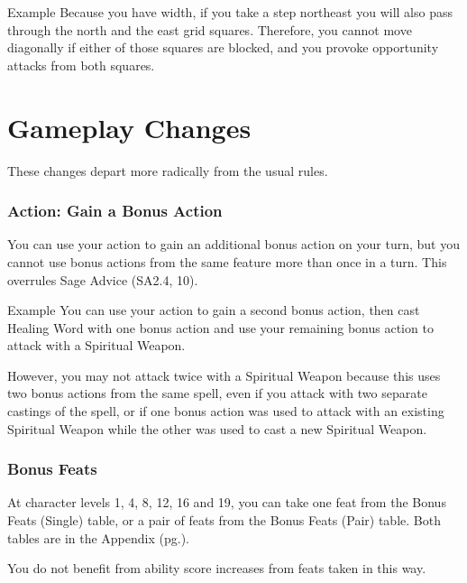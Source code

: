 \documentclass[letterpaper,twocolumn,openany,nodeprecatedcode]{dndbook}
\newcommand{\pg}[1]{pg.\pageref{#1}}
\begin{document}
\begin{DndComment}{Example}
Because you have width, if you take a step northeast you will also pass through the north and the east grid squares. Therefore, you cannot move diagonally if either of those squares are blocked, and you provoke opportunity attacks from both squares.
\end{DndComment}







\chapter{Gameplay Changes}

These changes depart more radically from the usual rules.

\label{gameplay-bonus-action}
\subsection{Action: Gain a Bonus Action}
You can use your action to gain an additional bonus action on your turn, but you cannot use bonus actions from the same feature more than once in a turn. This overrules Sage Advice (SA2.4, 10).

\begin{DndComment}{Example}
You can use your action to gain a second bonus action, then cast Healing Word with one bonus action and use your remaining bonus action to attack with a Spiritual Weapon. 

However, you may not attack twice with a Spiritual Weapon because this uses two bonus actions from the same spell, even if you attack with two separate castings of the spell, or if one bonus action was used to attack with an existing Spiritual Weapon while the other was used to cast a new Spiritual Weapon.
\end{DndComment}

\label{gameplay-feats-bonus}
\subsection{Bonus Feats}
At character levels 1, 4, 8, 12, 16 and 19, you can take one feat from the Bonus Feats (Single) table, or a pair of feats from the Bonus Feats (Pair) table. Both tables are in the Appendix (\pg{appendix-feats-bonus-table}).

You do not benefit from ability score increases from feats taken in this way.
\end{document}
